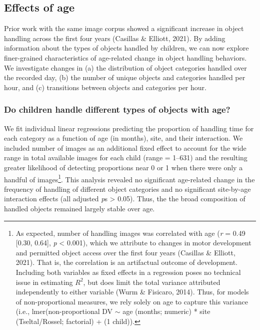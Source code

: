 \documentclass[10pt, letterpaper]{article}
\begin{document}
\hypertarget{effects-of-age}{%
\subsection{Effects of age}\label{effects-of-age}}

Prior work with the same image corpus showed a significant increase in
object handling across the first four years (Casillas \& Elliott, 2021).
By adding information about the types of objects handled by children, we
can now explore finer-grained characteristics of age-related change in
object handling behaviors. We investigate changes in (a) the
distribution of object categories handled over the recorded day, (b) the
number of unique objects and categories handled per hour, and (c)
transitions between objects and categories per hour.

\hypertarget{do-children-handle-different-types-of-objects-with-age}{%
\subsubsection{Do children handle different types of objects with
age?}\label{do-children-handle-different-types-of-objects-with-age}}

We fit individual linear regressions predicting the proportion of
handling time for each category as a function of age (in months), site,
and their interaction. We included number of images as an additional
fixed effect to account for the wide range in total available images for
each child (range = 1--631) and the resulting greater likelihood of
detecting proportions near 0 or 1 when there were only a handful of
images\footnote{As expected, number of handling images was correlated
  with age (\emph{r} = 0.49 {[}0.30, 0.64{]}, \emph{p} \textless{}
  0.001), which we attribute to changes in motor development and
  permitted object access over the first four years (Casillas \&
  Elliott, 2021). That is, the correlation is an artifactual outcome of
  development. Including both variables as fixed effects in a regression
  poses no technical issue in estimating \(R^{2}\), but does limit the
  total variance attributed independently to either variable (Wurm \&
  Fisicaro, 2014). Thus, for models of non-proportional measures, we
  rely solely on age to capture this variance (i.e.,
  lmer(non-proportional DV \({\sim}\) age (months; numeric) * site
  (Tseltal/Rossel; factorial) + (1 \textbar{} child)).}. This analysis
revealed no significant age-related change in the frequency of handling
of different object categories and no significant site-by-age
interaction effects (all adjusted \emph{p}s \textgreater{} 0.05). Thus,
the the broad composition of handled objects remained largely stable
over age.
\end{document}
